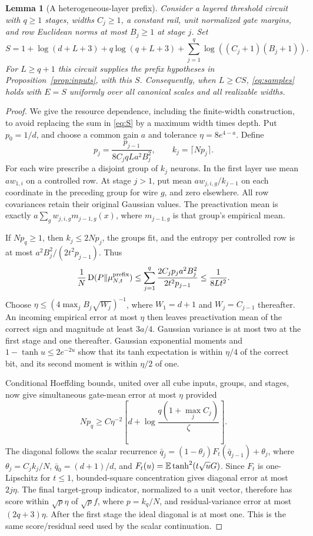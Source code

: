 \documentclass[11pt]{article}
\newtheorem{lemma}[theorem]{Lemma}
\theoremstyle{remark}\newtheorem{remark}[theorem]{Remark}
\newcommand{\KL}{\operatorname{D}}\newcommand{\poly}{\operatorname{poly}}
\begin{document}
\begin{lemma}[A heterogeneous-layer prefix]\label{lem:prefix}
Consider a layered threshold circuit with $q\ge1$ stages, widths
$C_j\ge1$, a constant rail, unit normalized gate margins, and
row Euclidean norms at most $B_j\ge1$ at stage $j$. Set
\begin{equation}\label{eq:S}
 S=1+\log(d+L+3)+q\log(q+L+3)
       +\sum_{j=1}^q\log((C_j+1)(B_j+1)).
\end{equation}
For $L\ge q+1$ this circuit supplies the prefix hypotheses in
Proposition~\ref{prop:inputs}, with this $S$. Consequently, when
$L\ge CS$, \eqref{eq:samples} holds with $E=S$ uniformly over
all canonical scales and all realizable widths.
\end{lemma}
\begin{proof}
We give the resource dependence, including the finite-width
construction, to avoid replacing the sum in \eqref{eq:S} by a
maximum width times depth. Put $p_0=1/d$, and choose a common
gain $a$ and tolerance $\eta=8e^{4-a}$. Define
\[
 p_j=\frac{p_{j-1}}{8C_jqLa^2B_j^2},\qquad
 k_j=\lceil Np_j\rceil.
\]
For each wire prescribe a disjoint group of $k_j$ neurons. In the
first layer use mean $aw_{1,i}$ on a controlled row. At stage $j>1$,
put mean $aw_{j,i,g}/k_{j-1}$ on each coordinate in the preceding
group for wire $g$, and zero elsewhere. All row covariances retain
their original Gaussian values. The preactivation mean is exactly
$a\sum_g w_{j,i,g}m_{j-1,g}(x)$, where $m_{j-1,g}$ is that group's
empirical mean.

If $Np_q\ge1$, then $k_j\le2Np_j$, the groups fit, and the entropy
per controlled row is at most $a^2B_j^2/(2t^2p_{j-1})$. Thus
\[
 \frac1N\KL(P\Vert\mu^{\rm prefix}_{N,t})
 \le\sum_{j=1}^q
       \frac{2C_jp_j a^2B_j^2}{2t^2p_{j-1}}
 \le\frac1{8Lt^2}.
\]
Choose $\eta\le(4\max_j B_j\sqrt{W_j})^{-1}$, where
$W_1=d+1$ and $W_j=C_{j-1}$ thereafter. An incoming empirical
error at most $\eta$ then leaves preactivation mean of the correct
sign and magnitude at least $3a/4$. Gaussian variance is at most
two at the first stage and one thereafter. Gaussian exponential
moments and $1-\tanh u\le2e^{-2u}$ show that its tanh expectation
is within $\eta/4$ of the correct bit, and its second moment is
within $\eta/2$ of one.

Conditional Hoeffding bounds, united over all cube inputs, groups,
and stages, now give simultaneous gate-mean error at most $\eta$
provided
\[
 Np_q\ge C\eta^{-2}
       \left[d+\log\frac{q(1+\max_j C_j)}{\zeta}\right].
\]
The diagonal follows the scalar recurrence
$\bar q_j=(1-\theta_j)F_t(\bar q_{j-1})+\theta_j$,
where $\theta_j=C_j k_j/N$, $\bar q_0=(d+1)/d$, and
$F_t(u)=\mathbb E\tanh^2(t\sqrt uG)$.
Since $F_t$ is one-Lipschitz for $t\le1$, bounded-square
concentration gives diagonal error at most $2j\eta$.
The final target-group indicator, normalized to a unit vector,
therefore has score within $\sqrt p\eta$ of $\sqrt p f$, where
$p=k_q/N$, and residual-variance error at most $(2q+3)\eta$.
After the first stage the ideal diagonal is at most one. This is
the same score/residual seed used by the scalar continuation.


\end{proof}
\end{document}
